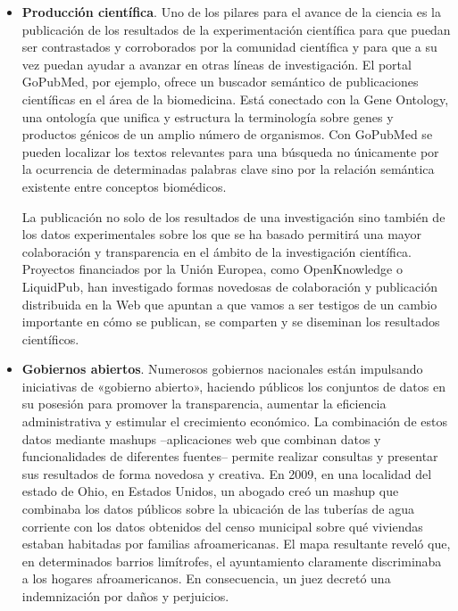 \begin{itemize}
	\item %
	\textbf{Producción científica}. Uno de los pilares para el avance de la ciencia es la publicación de los resultados de la experimentación científica para que puedan ser contrastados y corroborados por la comunidad científica y para que a su vez puedan ayudar a avanzar en otras líneas de investigación. El portal GoPubMed, por ejemplo, ofrece un buscador semántico de publicaciones científicas en el área de la biomedicina. Está conectado con la Gene Ontology, una ontología que unifica y estructura la terminología sobre genes y productos génicos de un amplio número de organismos. Con GoPubMed se pueden localizar los textos relevantes para una búsqueda no únicamente por la ocurrencia de determinadas palabras clave sino por la relación semántica existente entre conceptos biomédicos. 
	
	La publicación no solo de los resultados de una investigación sino también de los datos experimentales sobre los que se ha basado permitirá una mayor colaboración y transparencia en el ámbito de la investigación científica. Proyectos financiados por la Unión Europea, como OpenKnowledge o LiquidPub, han investigado formas novedosas de colaboración y publicación distribuida en la Web que apuntan a que vamos a ser testigos de un cambio importante en cómo se publican, se comparten y se diseminan los resultados científicos.
	
	\item %
	\textbf{Gobiernos abiertos}. Numerosos gobiernos nacionales están impulsando iniciativas de «gobierno abierto», haciendo públicos los conjuntos de datos en su posesión para promover la transparencia, aumentar la eficiencia administrativa y estimular el crecimiento económico. La combinación de estos datos mediante mashups –aplicaciones web que combinan datos y funcionalidades de diferentes fuentes– permite realizar consultas y presentar sus resultados de forma novedosa y creativa. En 2009, en una localidad del estado de Ohio, en Estados Unidos, un abogado creó un mashup que combinaba los datos públicos sobre la ubicación de las tuberías de agua corriente con los datos obtenidos del censo municipal sobre qué viviendas estaban habitadas por familias afroamericanas. El mapa resultante reveló que, en determinados barrios limítrofes, el ayuntamiento claramente discriminaba a los hogares afroamericanos. En consecuencia, un juez decretó una indemnización por daños y perjuicios.
	

\end{itemize}
